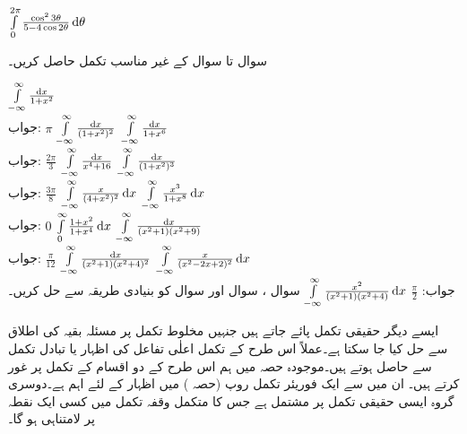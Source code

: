 \quad
$\int\limits_{0}^{2\pi} \frac{\cos^2 3\theta}{5-4\cos2\theta}\dif \theta$


سوال  تا سوال  کے غیر مناسب تکمل حاصل کریں۔

\quad
$\int\limits_{-\infty}^{\infty}\tfrac{\dif x}{1+x^2}$\\
جواب:\quad
$\pi$
\quad
$\int\limits_{-\infty}^{\infty}\tfrac{\dif x}{(1+x^2)^2}$
\quad
$\int\limits_{-\infty}^{\infty}\tfrac{\dif x}{1+x^6}$\\
جواب:\quad
$\tfrac{2\pi}{3}$
\quad
$\int\limits_{-\infty}^{\infty}\tfrac{\dif x}{x^4+16}$
\quad
$\int\limits_{-\infty}^{\infty}\tfrac{\dif x}{(1+x^2)^3}$\\
جواب:\quad
$\tfrac{3\pi}{8}$
\quad
$\int\limits_{-\infty}^{\infty}\tfrac{x}{(4+x^2)^2}\dif x$
\quad
$\int\limits_{-\infty}^{\infty}\tfrac{x^3}{1+x^8}\dif x$\\
جواب:\quad
$0$
\quad
$\int\limits_{0}^{\infty}\tfrac{1+x^2}{1+x^4}\dif x$
\quad
$\int\limits_{-\infty}^{\infty}\tfrac{\dif x}{(x^2+1)(x^2+9)}$\\
جواب:\quad
$\tfrac{\pi}{12}$
\quad
$\int\limits_{-\infty}^{\infty}\tfrac{\dif x}{(x^2+1)(x^2+4)^2}$
\quad
$\int\limits_{-\infty}^{\infty}\tfrac{x}{(x^2-2x+2)^2}\dif x$\\
جواب:\quad
$\tfrac{\pi}{2}$
\quad
$\int\limits_{-\infty}^{\infty}\tfrac{x^2}{(x^2+1)(x^2+4)}\dif x$
\quad
سوال ، سوال  اور سوال  کو بنیادی طریقہ سے حل کریں۔

ایسے دیگر حقیقی تکمل پائے جاتے ہیں جنہیں مخلوط تکمل پر مسئلہ بقیہ کی اطلاق سے حل کیا جا سکتا ہے۔عملاً اس طرح کے تکمل اعلٰی تفاعل کی اظہار یا تبادل تکمل سے حاصل ہوتے ہیں۔موجودہ حصہ میں ہم اس طرح کے دو اقسام  کے تکمل پر غور کرتے ہیں۔ ان میں سے ایک فوریئر تکمل روپ (حصہ ) میں اظہار کے لئے اہم ہے۔دوسری گروہ ایسی حقیقی تکمل پر مشتمل ہے جس کا متکمل وقفہ تکمل میں کسی ایک نقطہ پر لامتناہی ہو گا۔

